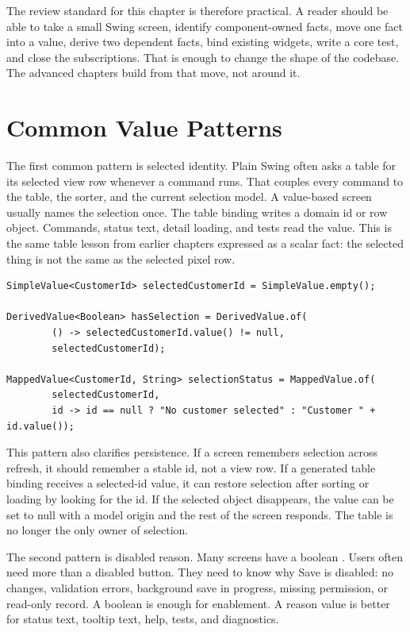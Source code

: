 The review standard for this chapter is therefore practical. A reader should be
able to take a small Swing screen, identify component-owned facts, move one fact
into a value, derive two dependent facts, bind existing widgets, write a core
test, and close the subscriptions. That is enough to change the shape of the
codebase. The advanced chapters build from that move, not around it.

\section{Common Value Patterns}

The first common pattern is selected identity. Plain Swing often asks a table for
its selected view row whenever a command runs. That couples every command to the
table, the sorter, and the current selection model. A value-based screen usually
names the selection once. The table binding writes a domain id or row object.
Commands, status text, detail loading, and tests read the value. This is the
same table lesson from earlier chapters expressed as a scalar fact: the selected
thing is not the same as the selected pixel row.

\begin{lstlisting}[caption={Selection as a domain value, not a table coordinate.}]
SimpleValue<CustomerId> selectedCustomerId = SimpleValue.empty();

DerivedValue<Boolean> hasSelection = DerivedValue.of(
        () -> selectedCustomerId.value() != null,
        selectedCustomerId);

MappedValue<CustomerId, String> selectionStatus = MappedValue.of(
        selectedCustomerId,
        id -> id == null ? "No customer selected" : "Customer " + id.value());
\end{lstlisting}

This pattern also clarifies persistence. If a screen remembers selection across
refresh, it should remember a stable id, not a view row. If a generated table
binding receives a selected-id value, it can restore selection after sorting or
loading by looking for the id. If the selected object disappears, the value can
be set to null with a model origin and the rest of the screen responds. The
table is no longer the only owner of selection.

The second pattern is disabled reason. Many screens have a boolean
. Users often need more than a disabled button. They need to know
why Save is disabled: no changes, validation errors, background save in
progress, missing permission, or read-only record. A boolean is enough for
enablement. A reason value is better for status text, tooltip text, help, tests,
and diagnostics.

